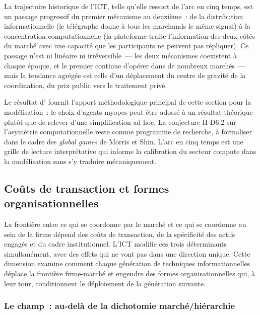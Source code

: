 La trajectoire historique de l'ICT, telle qu'elle ressort de l'arc en cinq temps, est un passage progressif du premier mécanisme au deuxième~: de la distribution informationnelle (le télégraphe donne à tous les marchands le même signal) à la concentration computationnelle (la plateforme traite l'information des deux côtés du marché avec une capacité que les participants ne peuvent pas répliquer). Ce passage n'est ni linéaire ni irréversible~--- les deux mécanismes coexistent à chaque époque, et le premier continue d'opérer dans de nombreux marchés~--- mais la tendance agrégée est celle d'un déplacement du centre de gravité de la coordination, du prix public vers le traitement privé.

Le résultat d'\textcite{evans_guesnerie_mcgough_2019} fournit l'apport méthodologique principal de cette section pour la modélisation~: le choix d'agents myopes peut être adossé à un résultat théorique plutôt que de relever d'une simplification ad hoc. La conjecture H-D6.2 sur l'asymétrie computationnelle reste comme programme de recherche, à formaliser dans le cadre des \emph{global games} de Morris et Shin. L'arc en cinq temps est une grille de lecture interprétative qui informe la calibration du secteur compute dans la modélisation sans s'y traduire mécaniquement.


\clearpage
\subsection{Coûts de transaction et formes organisationnelles}\label{sec:d7-transaction}

La frontière entre ce qui se coordonne par le marché et ce qui se coordonne au sein de la firme dépend des coûts de transaction, de la spécificité des actifs engagés et du cadre institutionnel. L'ICT modifie ces trois déterminants simultanément, avec des effets qui ne vont pas dans une direction unique. Cette dimension examine comment chaque génération de techniques informationnelles déplace la frontière firme-marché et engendre des formes organisationnelles qui, à leur tour, conditionnent le déploiement de la génération suivante.



\subsubsection{Le champ~: au-delà de la dichotomie marché/hiérarchie}

